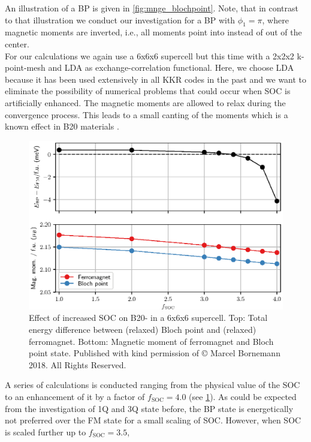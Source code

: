 \documentclass[graybox]{svmult}
\begin{document}
An illustration of a BP is given in \cref{fig:mnge_blochpoint}. Note, that in contrast to
that illustration we conduct our investigation for a BP with $\phi_{1}=\pi$, where magnetic moments
are inverted, i.e., all moments point into instead of out of the center.
\\
For our calculations we
again use a 6x6x6 supercell but this time with a 2x2x2 k-point-mesh and LDA as
exchange-correlation functional. Here, we choose LDA because it has been used extensively in all KKR codes
in the past and 
we want to eliminate the possibility of numerical problems that could occur when SOC is artificially enhanced.
The magnetic moments are allowed to relax during the convergence process.
This leads to a small canting of the moments which is a known effect in
B20 materials \cite{chizhikov_multishell_2013}.
\begin{figure}[!htb]
  \centering
   \includegraphics[width=1.00\textwidth]{Figures/MnGe_ferro_bp.eps}
	\caption{Effect of increased SOC on B20- in a 6x6x6 supercell.
	Top: Total energy difference between (relaxed) Bloch point and (relaxed) ferromagnet.
	Bottom: Magnetic moment of ferromagnet and Bloch point state.
	Published with kind permission of © Marcel Bornemann 2018. All Rights Reserved.}
\label{fig:MnGe_kkrnano_comparison_bp}
\end{figure}
A series of calculations is conducted ranging from the physical value of the SOC 
to
an enhancement of it by a
factor of $f_{\text{SOC}}=4.0$ (see \cref{fig:MnGe_kkrnano_comparison_bp}).
As could be expected from the investigation of 1Q and 3Q state before,
the BP state is energetically not preferred over the FM state for a small
scaling of SOC.
However, when SOC is scaled further up to $f_{\text{SOC}}=3.5$,
\end{document}
